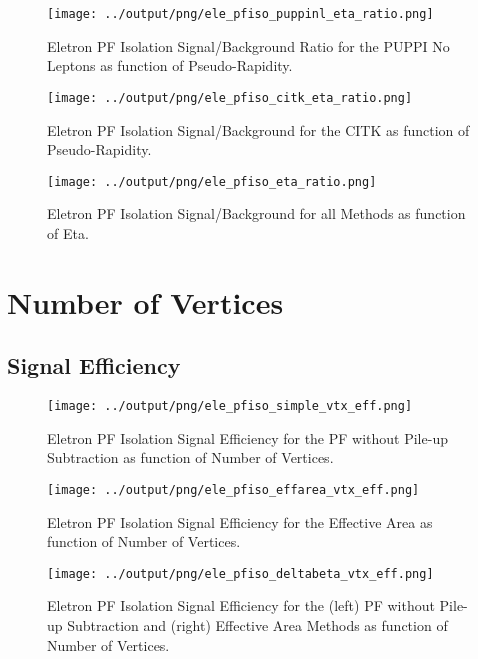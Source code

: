 \documentclass[11pt]{book}
\begin{document}
\begin{figure}[htb]
\centering
\texttt{[image: ../output/png/ele\_pfiso\_puppinl\_eta\_ratio.png]}
\caption{Eletron PF Isolation Signal/Background Ratio for the PUPPI No Leptons as function of Pseudo-Rapidity.}
\label{fig:ele_pfiso_eta_ratio_puppinl}
\end{figure}

\begin{figure}[htb]
\centering
\texttt{[image: ../output/png/ele\_pfiso\_citk\_eta\_ratio.png]}
\caption{Eletron PF Isolation Signal/Background for the CITK as function of Pseudo-Rapidity.}
\label{fig:ele_pfiso_eta_ratio_citk}
\end{figure}

\begin{figure}[htb]
\centering
\texttt{[image: ../output/png/ele\_pfiso\_eta\_ratio.png]}
\caption{Eletron PF Isolation Signal/Background for all Methods as function of Eta.}
\label{fig:ele_pfiso_eta_ratio}
\end{figure}
\clearpage

\section{Number of Vertices}
\subsection{Signal Efficiency}
\begin{figure}[htb]
\centering
\texttt{[image: ../output/png/ele\_pfiso\_simple\_vtx\_eff.png]}
\caption{Eletron PF Isolation Signal Efficiency for the PF without Pile-up Subtraction as function of Number of Vertices.}
\label{fig:ele_pfiso_vtx_eff_simple}
\end{figure}

\begin{figure}[htb]
\centering
\texttt{[image: ../output/png/ele\_pfiso\_effarea\_vtx\_eff.png]}
\caption{Eletron PF Isolation Signal Efficiency for the Effective Area as function of Number of Vertices.}
\label{fig:ele_pfiso_vtx_eff_effarea}
\end{figure}

\begin{figure}[htb]
\centering
\texttt{[image: ../output/png/ele\_pfiso\_deltabeta\_vtx\_eff.png]}
\caption{Eletron PF Isolation Signal Efficiency for the (left) PF without Pile-up Subtraction and (right) Effective Area Methods as function of Number of Vertices.}
\label{fig:ele_pfiso_vtx_eff_deltabeta}
\end{figure}
\end{document}
